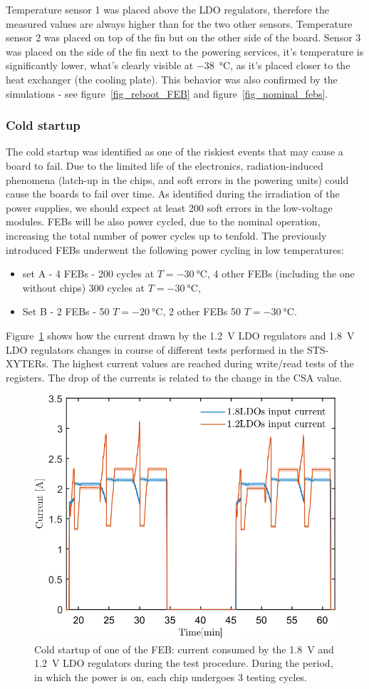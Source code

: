 Temperature sensor 1 was placed above the \gls{LDO} regulators, therefore the measured values are always higher than for the two other sensors. Temperature sensor 2 was placed on top of the fin but on the other side of the board. Sensor 3 was placed on the side of the fin next to the powering services, it's temperature is significantly lower, what's clearly visible at \SI{-38}{\celsius}, as it's placed closer to the heat exchanger (the cooling plate). This behavior was also confirmed by the simulations - see figure~\ref{fig_reboot_FEB} and figure~\ref{fig_nominal_febs}. 
\newpage

\subsubsection{Cold startup}
The cold startup was identified as one of the riskiest events that may cause a board to fail. Due to the limited life of the electronics, radiation-induced phenomena (latch-up in the chips, and soft errors in the powering units) could cause the boards to fail over time.  As identified during the irradiation of the power supplies, we should expect at least 200 soft errors in the low-voltage modules. \glspl{FEB} will be also power cycled, due to the nominal operation, increasing the total number of power cycles up to tenfold. The previously introduced \glspl{FEB} underwent the following power cycling in low temperatures:
\begin{itemize}
    \item set A - 4 \glspl{FEB} - 200 cycles at $T = \SI{-30}{\celsius}$, 4 other \glspl{FEB} (including the one without chips) 300 cycles at $T = \SI{-30}{\celsius}$,
    \item Set B - 2 \glspl{FEB} - 50 $T = \SI{-20}{\celsius}$, 2 other \glspl{FEB} 50 $T = \SI{-30}{\celsius}$.
\end{itemize}
Figure~\ref{fig_power_cycle} shows how the current drawn by the 1.2~V \gls{LDO} regulators and 1.8~V \gls{LDO} regulators changes in course of different tests performed in the STS-XYTERs. The highest current values are reached during write/read tests of the registers. The drop of the currents is related to the change in the \gls{CSA} value. 
\begin{figure}[!h]
\centering
\includegraphics[width=0.6\columnwidth]{Chapter4/images/currents.png}
\caption{Cold startup of one of the \gls{FEB}: current consumed by the 1.8~V and 1.2~V \gls{LDO} regulators during the test procedure. During the period, in which the power is on, each chip undergoes 3 testing cycles.}
\label{fig_power_cycle}
\end{figure}
\newpage
